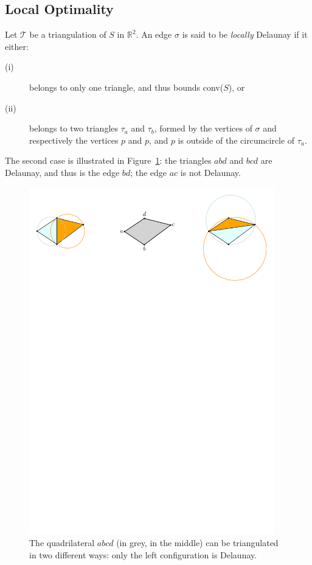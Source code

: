 \subsection{Local Optimality}
Let $\mathcal{T}$ be a triangulation of $S$ in $\mathbb{R}^2$. 
An edge $\sigma$ is said to be \emph{locally} Delaunay if it either:
\begin{description}
  \item[(i)] belongs to only one triangle, and thus bounds conv($S$), or
  \item[(ii)] belongs to two triangles $\tau_a$ and $\tau_b$, formed by the vertices of $\sigma$ and respectively the vertices $p$ and $p$, and $p$ is outside of the circumcircle of $\tau_a$. 
\end{description}
The second case is illustrated in Figure~\ref{fig:local}: the triangles $abd$ and $bcd$ are Delaunay, and thus is the edge $bd$; the edge $ac$ is not Delaunay.
\begin{figure}
  \centering
  \includegraphics[width=0.95\textwidth]{figs/local}
  \caption{The quadrilateral $abcd$ (in grey, in the middle) can be triangulated in two different ways: only the left configuration is Delaunay.} 
\label{fig:local}
\end{figure}
